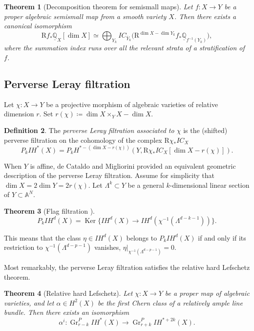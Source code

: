 \documentclass[JEP,XML,SOM,Unicode, NoEqCountersInSection,NoFloatCountersInSection,published]{cedram}
\let\ra\rightarrow
\newcommand{\IC}{\mathit{IC}}
\newcommand{\IH}{\mathit{IH}}
\DeclareMathOperator{\Ker}{Ker}
\newtheorem{thm}{Theorem}[section]
\theoremstyle{definition}
\newtheorem{defn}[thm]{Definition}
\newcommand{\Aff}{\mathbb{A}}
\newcommand{\QQ}{\mathbb{Q}}
\newcommand{\Gr}{\operatorname{Gr}}
\begin{document}
\begin{thm}[Decomposition theorem for semismall maps]\label{DecThm}
Let $f\colon X \to Y$ be a proper algebraic semismall map from a smooth variety $X$. Then there exists a canonical isomorphism
\[
\mathrm{R}f_* \underline{\QQ}_X [\dim X] \simeq \bigoplus_{Y_k} \IC_{\overline{Y}_k}\big(\mathrm{R}^{\dim X - \dim Y_k}f_*\underline{\QQ}_{f^{-1}(Y_k)}\big),
\]
where the summation index runs over all the relevant strata of a stratification of $f$.
\end{thm}
\subsection{Perverse Leray filtration}\label{sec:perverseleray}
Let $\chi\colon X\to Y$ be a projective morphism of algebraic varieties of relative dimension $r$. Set $r(\chi) \coloneqq \dim X \times_Y X - \dim X$.
\begin{defn}\label{Def:perverseLeray}
The \emph{perverse Leray filtration associated to $\chi$} is the (shifted) perverse filtration on the cohomology of the complex $\mathrm{R}\chi_*\IC_X$
\[
P_k \IH^*(X)=P_k H^{*-(\dim X -r(\chi))}(Y,\mathrm{R}\chi_*\IC_X[\dim X -r(\chi)]).
\]
\end{defn}

When $Y$ is affine, de Cataldo and Migliorini provided an equivalent geometric description of the perverse Leray filtration.
Assume for simplicity that
$\dim X = 2\dim Y = 2 r(\chi)$. Let $\Lambda^k\subset Y$ be a general $k$-dimensional linear section of $Y\subset \Aff^N$.

\skpt
\begin{thm}[Flag filtration {\cite[Th.\,4.1.1]{deCataldoMigliorini2010}}]\label{thm:kercharacterizationp}\mbox{}\vspace*{-.7\baselineskip}
\[
P_k \IH^d(X)=\Ker\bigl\lbrace \IH^d(X)\ra \IH^d(\chi^{-1}(\Lambda^{d-k-1}))
\bigr \rbrace.
\]
\end{thm}
This means that the class $\eta \in \IH^d(X)$ belongs to $P_k\IH^d(X)$ if and only if its restriction to $\chi^{-1}(\Lambda^{d-p-1})$ vanishes, \ie $\eta|_{ \chi^{-1}(\Lambda^{d-p-1})}=0$.

Most remarkably, the perverse Leray filtration satisfies the relative hard Lefschetz theorem.
\begin{thm}[Relative hard Lefschetz]\label{thm:rhl}
Let $\chi\colon X\to Y$ be a proper map of algebraic varieties, and let $\alpha\in H^2(X)$ be the first Chern class of a relatively ample line bundle. Then there exists an isomorphism
\[
\alpha^i\colon \Gr^P_{r-k}\IH^*(X)\to \Gr^P_{r+k}\IH^{*+2k}(X).
\]
\end{thm}
\end{document}
